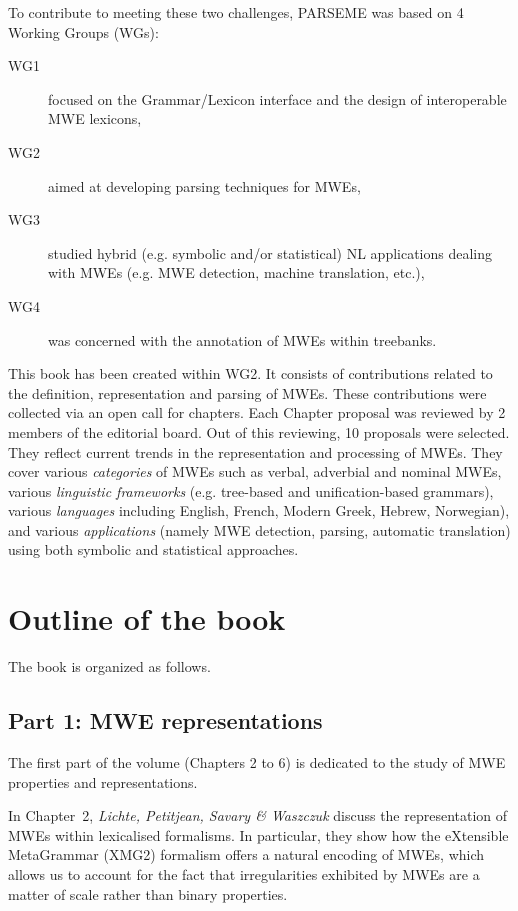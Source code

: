 \documentclass[output=paper]{langsci/langscibook}
\begin{document}
To contribute to meeting these two challenges, PARSEME was based on 4
Working Groups (WGs):
\begin{description}
\item[WG1] focused on the Grammar/Lexicon interface and the design of
  interoperable MWE lexicons,
\item[WG2] aimed at developing parsing techniques for MWEs,
\item[WG3] studied hybrid (e.g. symbolic and/or statistical) NL
  applications dealing with MWEs (e.g. MWE detection, machine
  translation, etc.),
\item[WG4] was concerned with the annotation of MWEs within treebanks.
\end{description}

This book has been created within WG2. It consists of contributions
related to the definition, representation and parsing of MWEs. These
contributions were collected via an open call for chapters. Each
Chapter proposal was reviewed by 2 members of the editorial board. Out
of this reviewing, 10 proposals were selected. They reflect current
trends in the representation and processing of MWEs. They cover
various \emph{categories} of MWEs such as verbal, adverbial and
nominal MWEs, various \emph{linguistic frameworks} (e.g. tree-based
and unification-based grammars), various \emph{languages} including
English, French, Modern Greek, Hebrew, Norwegian), and various
\emph{applications} (namely MWE detection, parsing, automatic
translation) using both symbolic and statistical approaches.

\section{Outline of the book}

The book is organized as follows. 

\subsection*{Part 1: MWE representations}

The first part of the volume (Chapters 2 to 6) is dedicated to the
study of MWE properties and representations.

In Chapter~2, \textit{Lichte, Petitjean, Savary \& Waszczuk} discuss
the representation of MWEs within lexicalised formalisms. In
particular, they show how the eXtensible MetaGrammar (XMG2) formalism
offers a natural encoding of MWEs, which allows us to account for the
fact that irregularities exhibited by MWEs are a matter of scale
rather than binary properties.
\end{document}

